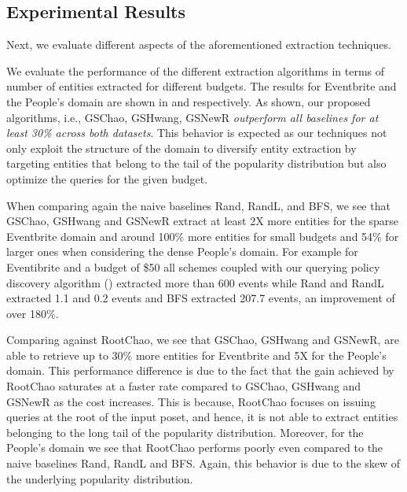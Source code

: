 \subsection{Experimental Results}
Next, we evaluate different aspects of the aforementioned extraction techniques. 

\vspace{3pt}
We evaluate the performance of the different extraction algorithms in terms of number of entities extracted for different budgets. The results for Eventbrite and the People's domain are shown in  and  respectively. As shown, our proposed algorithms, i.e., GSChao, GSHwang, GSNewR {\em outperform all baselines for at least 30\% across both datasets}. This behavior is expected as our techniques not only exploit the structure of the domain to diversify entity extraction by targeting entities that belong to the tail of the popularity distribution but also optimize the queries for the given budget.

When comparing again the naive baselines Rand, RandL, and BFS, we see that GSChao, GSHwang and GSNewR extract at least 2X more entities for the sparse Eventbrite domain and around 100\% more entities for small budgets and 54\% for larger ones when considering the dense People's domain. For example for Eventibrite and a budget of \$50 all schemes coupled with our querying policy discovery algorithm () extracted more than 600 events while Rand and RandL extracted 1.1 and 0.2 events and BFS extracted 207.7 events, an improvement of over 180\%.

Comparing against RootChao, we see that GSChao, GSHwang and GSNewR, are able to retrieve up to 30\% more entities for Eventbrite and 5X for the People's domain. This performance difference is due to the fact that the gain achieved by RootChao saturates at a faster rate compared to GSChao, GSHwang and GSNewR as the cost increases. This is because, RootChao focuses on issuing queries at the root of the input poset, and hence, it is not able to extract entities belonging to the long tail of the popularity distribution. Moreover, for the People's domain we see that RootChao performs poorly even compared to the naive baselines Rand, RandL and BFS. Again, this behavior is due to the skew of the underlying popularity distribution.

